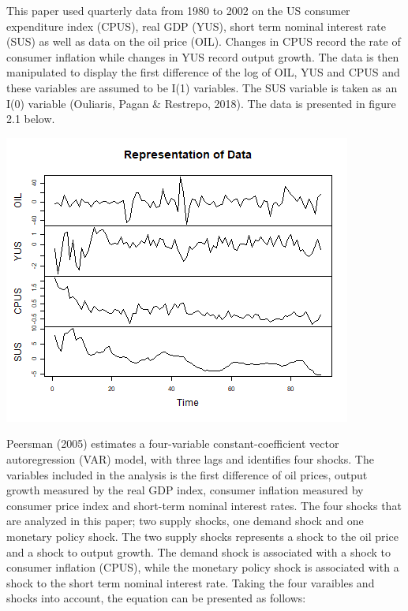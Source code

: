 \documentclass[11pt,preprint, authoryear]{elsarticle}
\let\origfigure\figure
\let\endorigfigure\endfigure
\renewenvironment{figure}[1][2] {
    \expandafter\origfigure\expandafter[H]
} {
    \endorigfigure
}
\numberwithin{equation}{section}
\numberwithin{figure}{section}
\numberwithin{table}{section}
\begin{document}
This paper used quarterly data from 1980 to 2002 on the US consumer
expenditure index (CPUS), real GDP (YUS), short term nominal interest
rate (SUS) as well as data on the oil price (OIL). Changes in CPUS
record the rate of consumer inflation while changes in YUS record output
growth. The data is then manipulated to display the first difference of
the log of OIL, YUS and CPUS and these variables are assumed to be I(1)
variables. The SUS variable is taken as an I(0) variable (Ouliaris,
Pagan \& Restrepo, 2018). The data is presented in figure 2.1 below.

\begin{figure}[H]

{\centering \includegraphics{replication_files/figure-latex/Figure1-1} 

}

\caption{Data\label{Figure1}}\label{fig:Figure1}
\end{figure}

Peersman (2005) estimates a four-variable constant-coefficient vector
autoregression (VAR) model, with three lags and identifies four shocks.
The variables included in the analysis is the first difference of oil
prices, output growth measured by the real GDP index, consumer inflation
measured by consumer price index and short-term nominal interest rates.
The four shocks that are analyzed in this paper; two supply shocks, one
demand shock and one monetary policy shock. The two supply shocks
represents a shock to the oil price and a shock to output growth. The
demand shock is associated with a shock to consumer inflation (CPUS),
while the monetary policy shock is associated with a shock to the short
term nominal interest rate. Taking the four varaibles and shocks into
account, the equation can be presented as follows:
\end{document}
